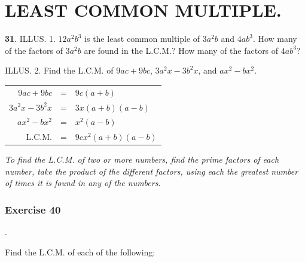 \documentclass{book}
\begin{document}
\section*{LEAST COMMON MULTIPLE.}


\textbf{31}. ILLUS. 1. $12 a^{2} b^{3}$ is the least common
multiple of $3 a^{2} b$ and $4 a b^{3}$. How many of the factors
of $3 a^{2} b$ are found in the L.C.M.? How many of the factors of
$4 a b^{3}$?

ILLUS. 2. Find the L.C.M. of $9 a c + 9 b c$, $3 a^{2} x - 3 b^{2}
x$, and $a x^{2} - b x^{2}$.

\begin{tabular}{rcl}
$9 a c + 9 b c$ & = & $9 c (a + b)$ \\
$3 a^{2} x - 3 b^{2} x$ & = & $3 x (a + b) (a - b)$ \\
$a x^{2} - b x^{2}$ & = & $x^{2} (a - b)$ \\ \hline
L.C.M. & = & $9 c x^{2} (a + b) (a - b)$
\end{tabular}

\textit{To find the L.C.M. of two or more numbers, find
the prime factors of each number, take the product
of the different factors, using each the greatest number
of times it is found in any of the numbers}.





\subsubsection*{Exercise 40}.

Find the L.C.M. of each of the following:
\end{document}
